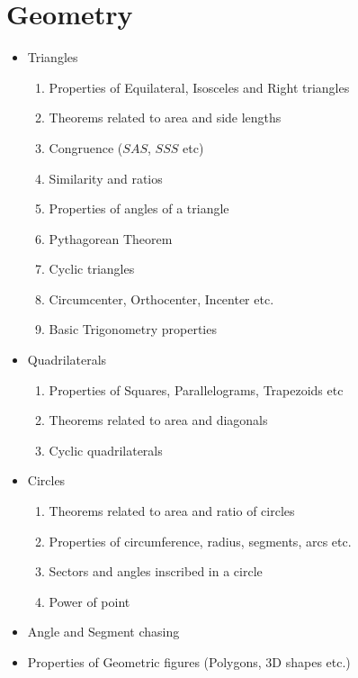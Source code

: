 \documentclass[oneside]{book}
\begin{document}
 \section{Geometry}
 \begin{itemize}
     \item Triangles
        \begin{enumerate}
            \item Properties of Equilateral, Isosceles and Right triangles
            \item Theorems related to area and side lengths
            \item Congruence ($SAS$, $SSS$ etc)
            \item Similarity and ratios
            \item Properties of angles of a triangle
            \item Pythagorean Theorem
            \item Cyclic triangles
            \item Circumcenter, Orthocenter, Incenter etc.
            \item Basic Trigonometry properties
        \end{enumerate}
    \item Quadrilaterals
        \begin{enumerate}
            \item Properties of Squares, Parallelograms, Trapezoids etc
            \item Theorems related to area and diagonals
            \item Cyclic quadrilaterals
        \end{enumerate}
    \item Circles
        \begin{enumerate}
            \item Theorems related to area and ratio of circles
            \item Properties of circumference, radius, segments, arcs etc.
            \item Sectors and angles inscribed in a circle
            \item Power of point
        \end{enumerate}
    \item Angle and Segment chasing
    \item Properties of Geometric figures (Polygons, 3D shapes etc.)
 \end{itemize}
 
 \newpage
 
\end{document}
